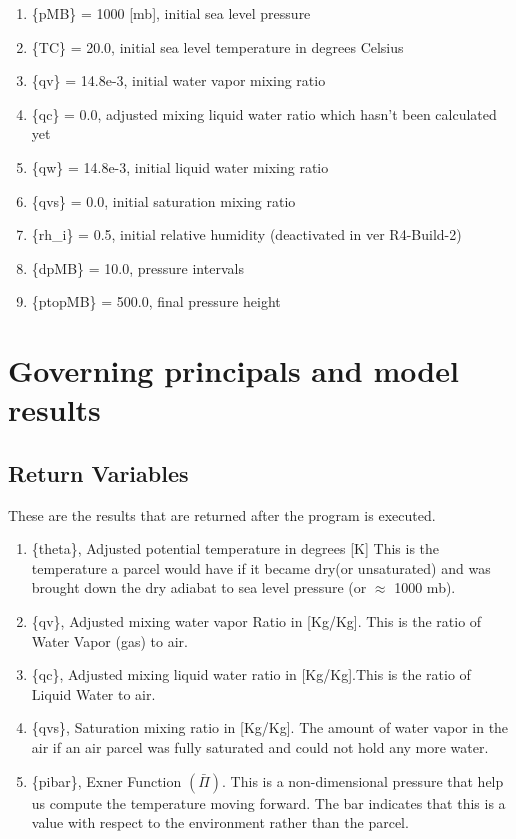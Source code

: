 \documentclass{article}
\begin{document}
\begin{enumerate}
\item \{pMB\} = 1000 [mb], initial sea level pressure
\item \{TC\} = 20.0, initial sea level temperature in degrees Celsius
\item \{qv\} = 14.8e-3, initial water vapor mixing ratio
\item \{qc\} = 0.0, adjusted mixing liquid water ratio which hasn't been calculated yet
\item \{qw\} = 14.8e-3, initial liquid water mixing ratio
\item \{qvs\} = 0.0, initial saturation mixing ratio
\item \{rh\_i\} = 0.5, initial relative humidity (deactivated in ver R4-Build-2)
\item \{dpMB\} = 10.0, pressure intervals
\item \{ptopMB\} = 500.0, final pressure height
\end{enumerate}


\newpage
\section{Governing principals and model results}

\subsection{Return Variables}\label{ret-vars}
These are the results that are returned after the program is executed.

\begin{enumerate}

\item \{theta\}, Adjusted potential temperature in degrees [K]
This is the temperature a parcel would have if it became dry(or unsaturated) and was brought down the dry adiabat to sea level pressure (or $\approx$ 1000 mb).

\item \{qv\}, Adjusted mixing water vapor Ratio in [Kg/Kg]. This is the ratio of Water Vapor (gas) to air.

\item \{qc\}, Adjusted mixing liquid water ratio in [Kg/Kg].This is the ratio of Liquid Water to air.

\item \{qvs\}, Saturation mixing ratio in [Kg/Kg]. The amount of water vapor in the air if an air parcel was fully saturated and could not hold any more water.

\item \{pibar\}, Exner Function $\left(\bar{\Pi}\right)$. This is a non-dimensional pressure that help us compute the temperature moving forward. The bar indicates that this is a value with respect to the environment rather than the parcel.

\end{enumerate}
\end{document}
